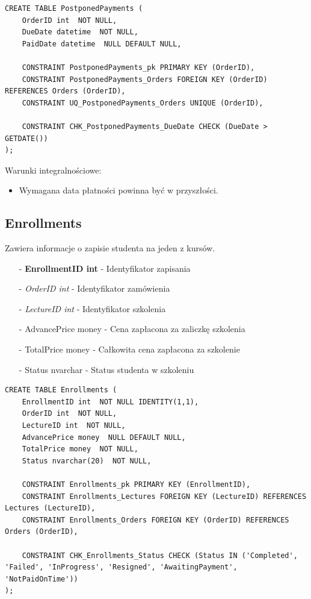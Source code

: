 \documentclass[11pt,a4paper]{article}
\begin{document}
\begin{Verbatim}[breaklines=true]
CREATE TABLE PostponedPayments (
    OrderID int  NOT NULL,
    DueDate datetime  NOT NULL,
    PaidDate datetime  NULL DEFAULT NULL,

    CONSTRAINT PostponedPayments_pk PRIMARY KEY (OrderID),
    CONSTRAINT PostponedPayments_Orders FOREIGN KEY (OrderID) REFERENCES Orders (OrderID),
    CONSTRAINT UQ_PostponedPayments_Orders UNIQUE (OrderID),

    CONSTRAINT CHK_PostponedPayments_DueDate CHECK (DueDate > GETDATE())
);
\end{Verbatim}

Warunki integralnościowe:
\begin{itemize}
    \item Wymagana data płatności powinna być w przyszłości.
\end{itemize}

\subsection{Enrollments}
Zawiera informacje o zapisie studenta na jeden z kursów.

\begin{itemize}
    \item[-] \textbf{EnrollmentID int} - Identyfikator zapisania
    \item[-] \textit{OrderID int} - Identyfikator zamówienia
    \item[-] \textit{LectureID int} - Identyfikator szkolenia
    \item[-] AdvancePrice money - Cena zapłacona za zaliczkę szkolenia
    \item[-] TotalPrice money - Całkowita cena zapłacona za szkolenie
    \item[-] Status nvarchar - Status studenta w szkoleniu    
\end{itemize}

\begin{Verbatim}[breaklines=true]
CREATE TABLE Enrollments (
    EnrollmentID int  NOT NULL IDENTITY(1,1),
    OrderID int  NOT NULL,
    LectureID int  NOT NULL,
    AdvancePrice money  NULL DEFAULT NULL,
    TotalPrice money  NOT NULL,
    Status nvarchar(20)  NOT NULL,

    CONSTRAINT Enrollments_pk PRIMARY KEY (EnrollmentID),
    CONSTRAINT Enrollments_Lectures FOREIGN KEY (LectureID) REFERENCES Lectures (LectureID),
    CONSTRAINT Enrollments_Orders FOREIGN KEY (OrderID) REFERENCES Orders (OrderID),

    CONSTRAINT CHK_Enrollments_Status CHECK (Status IN ('Completed', 'Failed', 'InProgress', 'Resigned', 'AwaitingPayment', 'NotPaidOnTime'))
);
\end{Verbatim}
\end{document}
